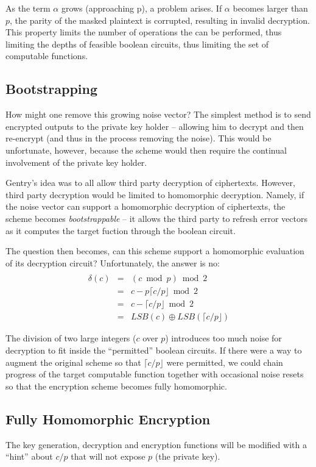 \documentclass[a4paper,10pt]{article}
\begin{document}
As the term $\alpha$ grows (approaching p), a problem arises. If
$\alpha$ becomes larger than $p$, the parity of the masked plaintext
is corrupted, resulting in invalid decryption. This property limits
the number of operations the can be performed, thus limiting the depths
of feasible boolean circuits, thus limiting the set of computable
functions.

\subsection{Bootstrapping}
How might one remove this growing noise vector? The simplest method is
to send encrypted outputs to the private key holder -- allowing him to
decrypt and then re-encrypt (and thus in the process removing the noise).
This would be unfortunate, however, because the scheme would then
require the continual involvement of the private key holder.

Gentry's idea was to all allow third party decryption of ciphertexts.
However, third party decryption would be limited to homomorphic
decryption. Namely, if the noise vector can support a homomorphic
decryption of ciphertexts, the scheme becomes \textit{bootstrappable} --
it allows the third party to refresh error vectors as it computes
the target fuction through the boolean circuit.

The question then becomes, can this scheme support a homomorphic
evaluation of its decryption circuit? Unfortunately, the answer is
no:
\begin{eqnarray*}
\\
\delta(c) &=& (c \bmod p) \bmod 2\\
&=& c - p \lceil c/p \rfloor \bmod 2\\
&=& c - \lceil c/p \rfloor \bmod 2\\
&=& LSB(c) \oplus LSB(\lceil c/p \rfloor)
\end{eqnarray*}

The division of two large integers ($c$ over $p$) introduces too much noise for
decryption to fit inside the ``permitted'' boolean circuits. If there were
a way to augment the original scheme so that $\lceil c/p \rfloor$ were
permitted, we could chain progress of the target computable function together
with occasional noise resets so that the encryption scheme becomes fully
homomorphic.

\subsection{Fully Homomorphic Encryption}
The key generation, decryption and encryption functions will be modified
with a ``hint'' about $c/p$ that will not expose $p$ (the private key).
\end{document}
